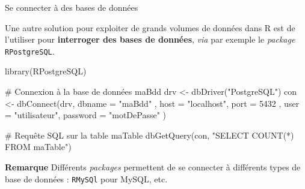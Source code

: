 \documentclass[12pt,handout,ignorenonframetext,]{beamer}
\newenvironment{Shaded}{}{}
\newcommand{\KeywordTok}[1]{\textcolor[rgb]{0.00,0.00,1.00}{{#1}}}
\newcommand{\DataTypeTok}[1]{{#1}}
\newcommand{\DecValTok}[1]{{#1}}
\newcommand{\StringTok}[1]{\textcolor[rgb]{0.00,0.50,0.50}{{#1}}}
\newcommand{\CommentTok}[1]{\textcolor[rgb]{0.00,0.50,0.00}{{#1}}}
\newcommand{\NormalTok}[1]{{#1}}
\renewenvironment{Shaded}{\begin{snugshade}}{\end{snugshade}}
\begin{document}
\begin{frame}[fragile]{\large Se connecter à des bases de données}

Une autre solution pour exploiter de grands volumes de données dans R
est de l'utiliser pour \textbf{interroger des bases de données},
\emph{via} par exemple le \emph{package} \texttt{RPostgreSQL}.

\footnotesize

\begin{Shaded}
\begin{Highlighting}[]
\KeywordTok{library}\NormalTok{(RPostgreSQL)}

\CommentTok{# Connexion à la base de données maBdd}
\NormalTok{drv <-}\StringTok{ }\KeywordTok{dbDriver}\NormalTok{(}\StringTok{"PostgreSQL"}\NormalTok{)}
\NormalTok{con <-}\StringTok{ }\KeywordTok{dbConnect}\NormalTok{(drv, }\DataTypeTok{dbname =} \StringTok{"maBdd"}
  \NormalTok{, }\DataTypeTok{host =} \StringTok{"localhost"}\NormalTok{, }\DataTypeTok{port =} \DecValTok{5432}
  \NormalTok{, }\DataTypeTok{user =} \StringTok{"utilisateur"}\NormalTok{, }\DataTypeTok{password =} \StringTok{"motDePasse"}
\NormalTok{)}

\CommentTok{# Requête SQL sur la table maTable}
\KeywordTok{dbGetQuery}\NormalTok{(con, }\StringTok{"SELECT COUNT(*) FROM maTable"}\NormalTok{)}
\end{Highlighting}
\end{Shaded}

\normalsize

\textbf{Remarque} Différents \emph{packages} permettent de se connecter
à différents types de base de données : \texttt{RMySQl} pour MySQL, etc.

\end{frame}
\end{document}
